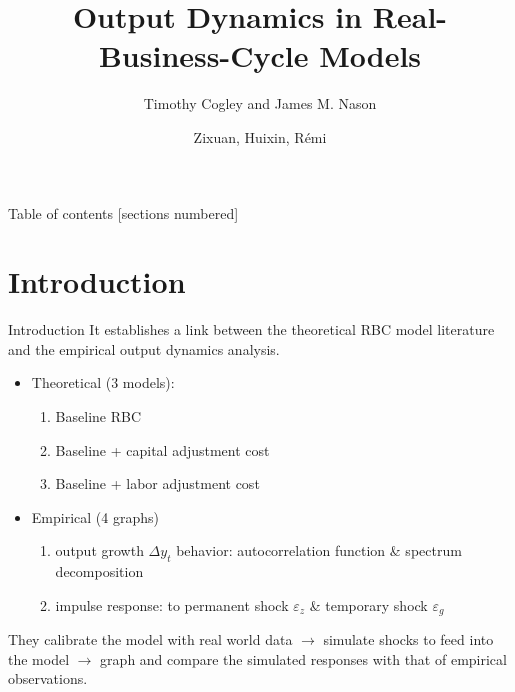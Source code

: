 \documentclass[10pt]{beamer}
\title{Output Dynamics in Real-Business-Cycle Models}
\subtitle{Timothy Cogley and James M. Nason}
\date{}
\author{Zixuan, Huixin, Rémi}
\institute{M2 ETE Macroeconomics 2}
\begin{document}
\maketitle

\begin{frame}{Table of contents}
  [sections numbered]
  \tableofcontents%
\end{frame}

\section{Introduction}

\begin{frame}{Introduction}
    It establishes a link between the \alert{theoretical} RBC model literature and the \alert{empirical} output dynamics analysis.
    \begin{itemize}
        \item Theoretical (3 models): 
        \begin{enumerate}
            \item Baseline RBC
            \item Baseline + capital adjustment cost
            \item Baseline + labor adjustment cost
        \end{enumerate}
        \item Empirical (4 graphs)
        \begin{enumerate}
            \item output growth $\Delta y_t$ behavior: autocorrelation function \& spectrum decomposition
            \item impulse response: to \alert{permanent} shock $\varepsilon_z$ \& \alert{temporary} shock $\varepsilon_g$
        \end{enumerate} 
    \end{itemize}
They calibrate the model with real world data $\to$ simulate shocks to feed into the model $\to$ graph and compare the simulated responses with that of empirical observations.

\end{frame}
\end{document}
